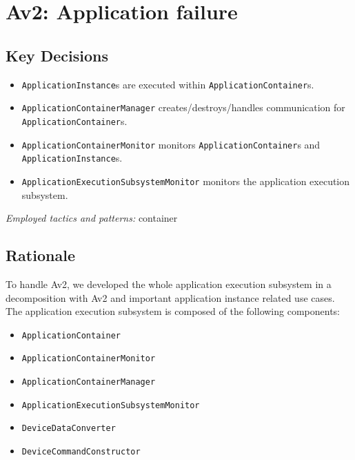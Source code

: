 \section{Av2: Application failure}

    \subsection*{Key Decisions}

        \begin{itemize}
        	\item \texttt{ApplicationInstance}s are executed within \texttt{ApplicationContainer}s.
            \item \texttt{ApplicationContainerManager} creates/destroys/handles communication for \texttt{ApplicationContainer}s.
            \item \texttt{ApplicationContainerMonitor} monitors \texttt{ApplicationContainer}s and \texttt{ApplicationInstance}s.
            \item \texttt{ApplicationExecutionSubsystemMonitor} monitors the application execution subsystem.
        \end{itemize}
        \emph{Employed tactics and patterns:} container

    \subsection*{Rationale}
        To handle Av2, we developed the whole application execution subsystem in a decomposition
        with Av2 and important application instance related use cases. The application execution subsystem
        is composed of the following components:
        \begin{itemize}
            \item \texttt{ApplicationContainer}
            \item \texttt{ApplicationContainerMonitor}
            \item \texttt{ApplicationContainerManager}
            \item \texttt{ApplicationExecutionSubsystemMonitor}
            \item \texttt{DeviceDataConverter}
            \item \texttt{DeviceCommandConstructor}
        \end{itemize}

